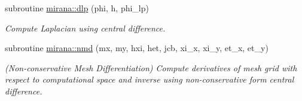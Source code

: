 \begin{DoxyCompactItemize}
subroutine \hyperlink{namespacemirana_ab052150258d81ff9a91ca5b86f0359b3}{mirana\+::dlp} (phi, h, phi\+\_\+lp)
\begin{DoxyCompactList}\small\item\em Compute Laplacian using central difference. \end{DoxyCompactList}\item 
subroutine \hyperlink{namespacemirana_a53c223d4530275ef3fc6a5820f5b0990}{mirana\+::nmd} (mx, my, hxi, het, jcb, xi\+\_\+x, xi\+\_\+y, et\+\_\+x, et\+\_\+y)
\begin{DoxyCompactList}\small\item\em (Non-\/conservative Mesh Differentiation) Compute derivatives of mesh grid with respect to computational space and inverse using non-\/conservative form central difference. \end{DoxyCompactList}\end{DoxyCompactItemize}
